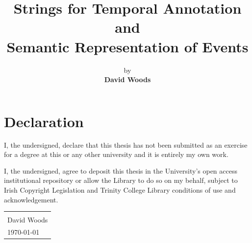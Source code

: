 \documentclass[a4paper,12pt,leqno]{article}
\title{\textbf{Strings for Temporal Annotation and\\Semantic Representation of Events}}
\author{by\\{\textbf{David Woods}}\bigskip\bigskip}
\date{\parbox{\linewidth}{\centering%
		{\large A dissertation submitted\\in fulfillment of the requirements\\for the Degree of\\\textbf{Doctor of Philosophy}}\\		
		\bigskip\bigskip\bigskip
		{\Large \textbf{University of Dublin, Trinity College}}\\\endgraf \monthyeardate\today}{\small \vspace{\fill} Supervised by: Dr Tim Fernando, Dr Carl Vogel}}
\begin{document}
\maketitle
\thispagestyle{empty}

\newpage
{}
\section*{Declaration}
\noindent
I, the undersigned, declare that this thesis has not been submitted as an exercise for a degree at this or any other university and it is entirely my own work.\par

\vspace{2em}

\noindent
I, the undersigned, agree to deposit this thesis in the University's open access institutional repository or allow the Library to do so on my behalf, subject to Irish Copyright Legislation and Trinity College Library conditions of use and acknowledgement.


\vspace{\fill}

\begin{table}[!htbp]
	\flushright
	\begin{tabular}{l}
		\makebox[10cm]{\hrulefill}\\[0.5cm]
		David Woods\\[0.25cm]
		{\monthyeardate\today}
	\end{tabular}
\end{table}

\vspace{5em}

\newpage
\begin{abstract}
\noindent
\end{abstract}
\end{document}
